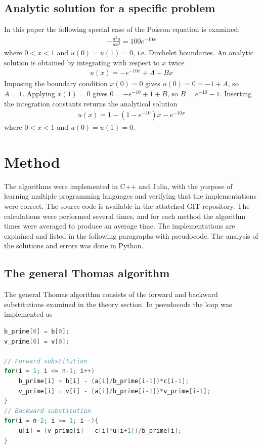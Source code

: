 \documentclass[aps,reprint]{revtex4-1}
\begin{document}
\subsection{Analytic solution for a specific problem}
In this paper the following special case of the Poisson equation is examined:
\begin{align}
  - \frac{d^2 u}{dx^2} = 100 e^{-10x}
\end{align}
where $0 < x < 1$ and $u(0) = u(1) = 0$, i.e. Dirchelet boundaries. An analytic
solution is obtained by integrating with respect to $x$ twice
\begin{align*}
  u(x) = -e^{-10x} + A + Bx
\end{align*}
Imposing the boundary condition $x(0) = 0$ gives $u(0) = 0 = -1 + A$, so
$A = 1$. Applying $x(1) = 0$ gives $0 = -e^{-10} + 1 + B$, so $B = e^{-10} - 1$.
Inserting the integration constants returns the analytical solution
\begin{align}
  u(x) = 1 - (1 - e^{-10})x - e^{-10x}
\end{align}
where $0 < x < 1$ and $u(0) = u(1) = 0$.

\section{Method}
The algorithms were implemented in C++ and Julia, with the purpose of
learning multiple programming languages and verifying that the implementations were correct.
The source code is available in the attatched GIT-repository. The calculations
were performed several times, and for each method the algorithm times were averaged to produce an
average time. The implementations are explained and listed in the following paragraphs with pseudocode.
The analysis of the solutions and errors was done in Python.

\subsection{The general Thomas algorithm}
The general Thomas algorithm consists of the forward and backward substitutions
examined in the theory section. In pseudocode the loop was implemented as
\begin{lstlisting}[language=cpp, caption={Thomas algorithm implementation for a general tridiagonal matrix}]
b_prime[0] = b[0];
v_prime[0] = v[0];

// Forward substitution
for(i = 1; i <= n-1; i++)
    b_prime[i] = b[i] - (a[i]/b_prime[i-1])*c[i-1];
    v_prime[i] = v[i] - (a[i]/b_prime[i-1])*v_prime[i-1];
}
// Backward substitution
for(i = n-2; i >= 1; i--){
    u[i] = (v_prime[i] - c[i]*u[i+1])/b_prime[i];
}
\end{lstlisting}
\end{document}
